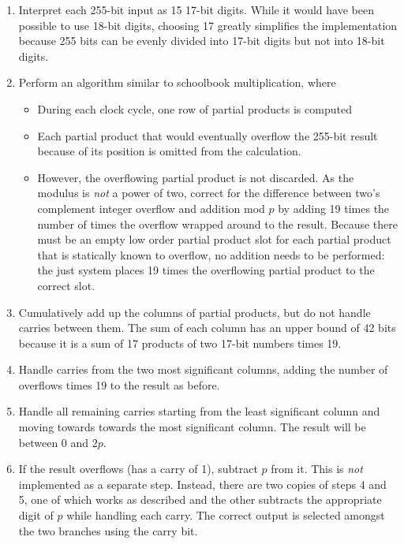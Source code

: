 \begin{enumerate}
\def\labelenumi{\arabic{enumi}.}
\itemsep1pt\parskip0pt
\item
  Interpret each 255-bit input as 15 17-bit digits. While it would have
  been possible to use 18-bit digits, choosing 17 greatly simplifies the
  implementation because 255 bits can be evenly divided into 17-bit
  digits but not into 18-bit digits.
\item
  Perform an algorithm similar to schoolbook multiplication, where

  \begin{itemize}
  \itemsep1pt\parskip0pt
  \item
    During each clock cycle, one row of partial products is computed
  \item
    Each partial product that would eventually overflow the 255-bit
    result because of its position is omitted from the calculation.
  \item
    However, the overflowing partial product is not discarded. As the
    modulus is \emph{not} a power of two, correct for the difference
    between two's complement integer overflow and addition mod \(p\) by
    adding 19 times the number of times the overflow wrapped around to
    the result. Because there must be an empty low order partial product
    slot for each partial product that is statically known to overflow,
    no addition needs to be performed: the just system places 19 times
    the overflowing partial product to the correct slot.
  \end{itemize}
\item
  Cumulatively add up the columns of partial products, but do not handle
  carries between them. The sum of each column has an upper bound of 42
  bits because it is a sum of 17 products of two 17-bit numbers times
  19.
\item
  Handle carries from the two most significant columns, adding the
  number of overflows times 19 to the result as before.
\item
  Handle all remaining carries starting from the least significant
  column and moving towards towards the most significant column. The
  result will be between \(0\) and \(2p\).
\item
  If the result overflows (has a carry of 1), subtract \(p\) from it.
  This is \emph{not} implemented as a separate step. Instead, there are
  two copies of steps 4 and 5, one of which works as described and the
  other subtracts the appropriate digit of \(p\) while handling each
  carry. The correct output is selected amongst the two branches using
  the carry bit.
\end{enumerate}

